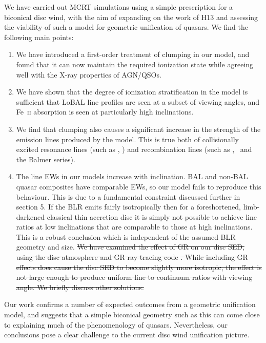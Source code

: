 \documentclass[preprint, a4paper, 11pt]{aastex}
\providecommand{\DIFdel}[1]{{\protect\color{red}\sout{#1}}}                      %
\providecommand{\DIFdelbegin}{} %
\providecommand{\DIFdelend}{} %
\begin{document}
We have carried out MCRT simulations using a simple
prescription for a biconical disc wind, with
the aim of expanding on the work of H13 and assessing 
the viability of such a model for geometric unification of quasars.
We find the following main points:

\begin{enumerate}
\item We have introduced a first-order treatment 
of clumping in our model, and found that it can now maintain
the required ionization state while agreeing well with the X-ray
properties of AGN/QSOs.
\smallskip
\item We have shown that the degree of ionization stratification
in the model is sufficient that LoBAL line profiles
are seen at a subset of viewing angles, and Fe~\textsc{ii}
absorption is seen at particularly high inclinations.
\smallskip
\item We find that clumping also causes a significant 
increase in the strength of the  emission
lines produced by the model. This is true both
of collisionally excited resonance lines (such as \civ, \nv)
and recombination lines (such as \la, \ha\ and the Balmer series).
\smallskip
\item The line EWs in our models increase with inclination.
BAL and non-BAL quasar composites have comparable EWs, so our model
fails to reproduce this behaviour.
This is due to a fundamental constraint discussed further in section 5. If the BLR
emits fairly isotropically then for a foreshortened, limb-darkened classical thin accretion disc
it is simply not possible to achieve line ratios at low inclinations that are comparable to
those at high inclinations. This is a robust conclusion which 
is independent of the assumed BLR geometry and size.
\DIFdelbegin %
\DIFdel{We have examined the effect of GR on our disc SED, using the disc atmosphere
and GR ray-tracing code }%
\DIFdel{. While including GR effects
does cause the disc SED to become slightly more isotropic,
the effect is not large enough to produce uniform line to continuum ratios
with viewing angle. We briefly discuss other solutions.
}\DIFdelend %
\end{enumerate}
Our work confirms a number of expected outcomes from a geometric unification 
model, and suggests that a simple biconical geometry such as this can come close to 
explaining much of the  phenomenology of quasars. Nevertheless, our conclusions pose 
a clear challenge to the current disc wind unification picture.
\end{document}
